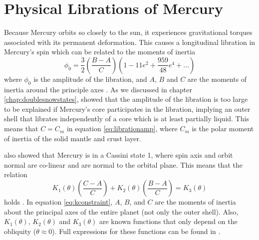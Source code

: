 \section{Physical Librations of Mercury}
Because Mercury orbits so closely to the sun, it experiences gravitational torques associated with its permanent deformation. This causes a longitudinal libration in Mercury's spin which can be related to the moments of inertia
\begin{equation}
\phi_{0}=\frac{3}{2}\left(\frac{B-A}{C}\right)\left(1-11e^2+\frac{959}{48}e^4+\ldots\right)
\label{eq:librationamp}
\end{equation}
where $\phi_{0}$ is the amplitude of the libration, and $A$, $B$ and $C$ are the moments of inertia around the principle axes \citep{peale1972}. As we discussed in chapter \ref{chap:doublesnowstates}, \citet{margot2007} showed that the amplitude of the libration is too large to be explained if Mercury's core participates in the libration, implying an outer shell that librates independently of a core which is at least partially liquid. This means that $C=C_m$ in equation \ref{eq:librationamp}, where $C_m$ is the polar moment of inertia of the solid mantle and crust layer.

\citet{margot2007} also showed that Mercury is in a Cassini state 1, where spin axis and orbit normal are co-linear and are normal to the orbital plane. This means that the relation
\begin{equation}
K_1\left(\theta\right)\left(\frac{C-A}{C}\right)+K_2\left(\theta\right)\left(\frac{B-A}{C}\right)=K_{3}\left(\theta\right)
\label{eq:kconstraint}
\end{equation}
holds \citep{peale1969}. In equation \ref{eq:kconstraint}, $A$, $B$, and $C$ are the moments of inertia about the principal axes of the entire planet (not only the outer shell). Also, $K_1\left(\theta\right)$, $K_2\left(\theta\right)$ and $K_3\left(\theta\right)$ are known functions that only depend on the obliquity ($\theta\approx0$). Full expressions for these functions can be found in \citet{peale1969}.

